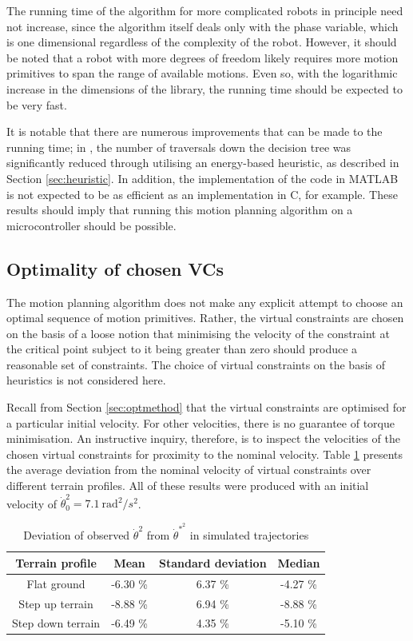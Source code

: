 The running time of the algorithm for more complicated robots in principle need not increase, since the algorithm itself deals only with the phase variable, which is one dimensional regardless of the complexity of the robot. However, it should be noted that a robot with more degrees of freedom likely requires more motion primitives to span the range of available motions. Even so, with the logarithmic increase in the dimensions of the library, the running time should be expected to be very fast.

It is notable that there are numerous improvements that can be made to the running time; in \cite{manchester13planning}, the number of traversals down the decision tree was significantly reduced through utilising an energy-based heuristic, as described in Section \ref{sec:heuristic}. In addition, the implementation of the code in MATLAB is not expected to be as efficient as an implementation in C, for example. These results should imply that running this motion planning algorithm on a microcontroller should be possible.

\subsection{Optimality of chosen VCs} \label{sec:resnom}
The motion planning algorithm does not make any explicit attempt to choose an optimal sequence of motion primitives. Rather, the virtual constraints are chosen on the basis of a loose notion that minimising the velocity of the constraint at the critical point subject to it being greater than zero should produce a reasonable set of constraints. The choice of virtual constraints on the basis of heuristics is not considered here.

Recall from Section \ref{sec:optmethod} that the virtual constraints are optimised for a particular initial velocity. For other velocities, there is no guarantee of torque minimisation. An instructive inquiry, therefore, is to inspect the velocities of the chosen virtual constraints for proximity to the nominal velocity. Table \ref{tab:nomvel} presents the average deviation from the nominal velocity of virtual constraints over different terrain profiles. All of these results were produced with an initial velocity of $\dot{\theta}_0^2=7.1~\mathrm{rad}^2/s^2$.

\begin{table}
	\centering
	\begin{tabular}{c | c | c | c }
		Terrain profile & Mean & Standard deviation & Median \\ \hline
		Flat ground & -6.30 \% & 6.37 \% & -4.27 \% \\
		Step up terrain & -8.88 \% & 6.94 \% & -8.88 \% \\
		Step down terrain & -6.49 \% & 4.35 \% & -5.10 \%\\
	\end{tabular}
	\caption{Deviation of observed $\dot{\theta}^2$ from $\dot{\theta}^{*^2}$ in simulated trajectories}
	\label{tab:nomvel}
\end{table}

